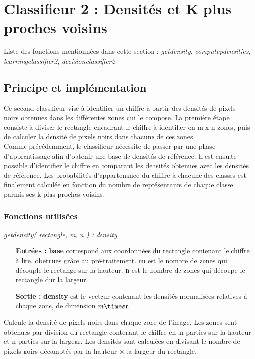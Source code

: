 \section{Classifieur 2 : Densités et K plus proches voisins}
Liste des fonctions mentionnées dans cette section : \textit{getdensity}, \textit{computepdensities}, \textit{learningclassifier2}, \textit{decisionclassifier2}

\subsection{Principe et implémentation}

Ce second classifieur vise à identifier un chiffre à partir des densités de pixels noirs obtenues dans les différentes zones qui le compose. La première étape consiste à diviser le rectangle encadrant le chiffre à identifier en m x n zones, puis de calculer la densité de pixels noirs dans chacune de ces zones.\\

Comme précédemment, le classifieur nécessite de passer par une phase d'apprentissage afin d'obtenir une base de densités de référence. Il est ensuite possible d'identifier le chiffre en comparant les densités obtenues avec les densités de référence. Les probabilités d'appartenance du chiffre à chacune des classes est finalement calculée en fonction du nombre de représentants de chaque classe parmis ses k plus proches voisins.

\subsubsection{Fonctions utilisées}

\textit{getdensity( rectangle, m, n ) : density}\\
\begin{itemize}
	\item[\textbf{Entrées :}] \textbf{base} correspond aux coordonnées du rectangle contenant le chiffre à lire, obetnues grâce au pré-traitement. \textbf{m} est le nombre de zones qui découple le rectange sur la hauteur. \textbf{n} est le nombre de zones qui découpe le rectangle dur la largeur.
	\item[\textbf{Sortie :}] \textbf{density} est le vecteur contenant les densités normalisées relatives à chaque zone, de dimension $m\timesn$
\end{itemize}
Calcule la densité de pixels noirs dans chaque zone de l'image. Les zones sont obtenues par division du rectangle contenant le chiffre en m parties sur la hauteur et n parties sur la largeur. Les densités sont calculées en divisant le nombre de pixels noirs décomptés par la hauteur $\times$ la largeur du rectangle.\\

